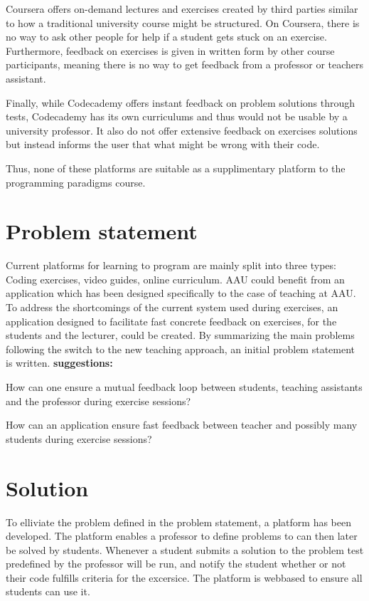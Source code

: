 Coursera offers on-demand lectures and exercises created by third parties similar to how a traditional university course might be structured.
On Coursera, there is no way to ask other people for help if a student gets stuck on an exercise.
Furthermore, feedback on exercises is given in written form by other course participants, meaning there is no way to get feedback from a professor or teachers assistant. 


Finally, while Codecademy offers instant feedback on problem solutions through tests, Codecademy has its own curriculums and thus would not be usable by a university professor. 
It also do not offer extensive feedback on exercises solutions but instead informs the user that what might be wrong with their code. 


Thus, none of these platforms are suitable as a supplimentary platform to the programming paradigms course. 
\section{Problem statement}
Current platforms for learning to program are mainly split into three types: Coding exercises, video guides, online curriculum. 
AAU could benefit from an application which has been designed specifically to the case of teaching at AAU.
To address the shortcomings of the current system used during exercises, an application designed to facilitate fast concrete feedback on exercises, for the students and the lecturer, could be created.
By summarizing the main problems following the switch to the new teaching approach, an initial problem statement is written.
\textbf{suggestions:}
\begin{displayquote}
How can one ensure a mutual feedback loop between students, teaching assistants and the professor during exercise sessions?
\end{displayquote} 

\begin{displayquote}
    How can an application ensure fast feedback between teacher and possibly many students during exercise sessions?
\end{displayquote} 

\section{Solution}
To elliviate the problem defined in the problem statement, a platform has been developed.
The platform enables a professor to define problems to can then later be solved by students.
Whenever a student submits a solution to the problem test predefined by the professor will be run, and notify the student whether or not their code fulfills criteria for the excersice. 
The platform is webbased to ensure all students can use it.